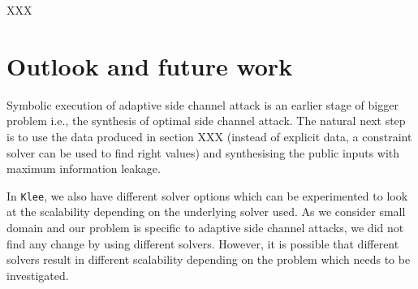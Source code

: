 \documentclass[11pt,a4paper,notitlepage]{article}
\begin{document}
XXX

\newpage

\section{Outlook and future work}
\label{sec:futurework}

Symbolic execution of adaptive side channel attack is an earlier stage of bigger problem i.e., the synthesis of optimal side channel attack.
The natural next step is to use the data produced in section XXX (instead of explicit data, a constraint solver can be used to find right values) and synthesising the public inputs with maximum information leakage.

In \texttt{Klee}, we also have different solver options which can be experimented to look at the scalability depending on the underlying solver used.
As we consider small domain and our problem is specific to adaptive side channel attacks, we did not find any change by using different solvers.
However, it is possible that different solvers result in different scalability depending on the problem which needs to be investigated.




\end{document}
